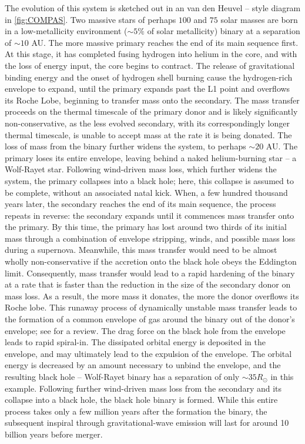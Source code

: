 \documentclass[iop,onecolumn]{revtex4}
\begin{document}
The evolution of this system is sketched out in an van den Heuvel -- style diagram in \autoref{fig:COMPAS}.  Two massive stars of perhaps $100$ and $75$ solar masses are born in a low-metallicity environment ($\sim 5\%$ of solar metallicity)  binary at a separation of $\sim 10$ AU.  The more massive primary reaches the end of its main sequence first.  At this stage, it has completed fusing hydrogen into helium in the core, and with the loss of energy input, the core begins to contract.  The release of gravitational binding energy and the onset of hydrogen shell burning cause the hydrogen-rich envelope to expand, until the primary expands past the L1 point and overflows its Roche Lobe, beginning to transfer mass onto the secondary.  The mass transfer proceeds on the thermal timescale of the primary donor and is likely significantly non-conservative, as the less evolved secondary, with its correspondingly longer thermal timescale, is unable to accept mass at the rate it is being donated.  The loss of mass from the binary further widens the system, to perhaps $\sim 20$ AU.  The primary loses its entire envelope, leaving behind a naked helium-burning star -- a Wolf-Rayet star.  Following wind-driven mass loss, which further widens the system, the primary collapses into a black hole; here, this collapse is assumed to be complete, without an associated natal kick.  When, a few hundred thousand years later, the secondary reaches the end of its main sequence, the process repeats in reverse: the secondary expands until it commences mass transfer onto the primary.  By this time, the primary has lost around two thirds of its initial mass through a combination of envelope stripping, winds, and possible mass loss during a supernova.  Meanwhile, this mass transfer would need to be almost wholly non-conservative if the accretion onto the black hole obeys the Eddington limit.  Consequently, mass transfer would lead to a rapid hardening of the binary at a rate that is faster than the reduction in the size of the secondary donor on mass loss.  As a result, the more mass it donates, the more the donor overflows its Roche lobe.  This runaway process of dynamically unstable mass transfer leads to the formation of a common envelope of gas around the binary out of the donor's envelope; see \citet{Ivanova:2013} for a review.  The drag force on the black hole from the envelope leads to rapid spiral-in.   The dissipated orbital energy is deposited in the envelope, and may ultimately lead to the expulsion of the envelope.  The orbital energy is decreased by an amount necessary to unbind the envelope, and the resulting black hole -- Wolf-Rayet binary has a separation of only $\sim 35 R_\odot$ in this example.  Following further wind-driven mass loss from the secondary and its collapse into a black hole, the black hole binary is formed.  While this entire process takes only a few million years after the formation the binary, the subsequent inspiral through gravitational-wave emission will last for around 10 billion years before merger.
\end{document}
